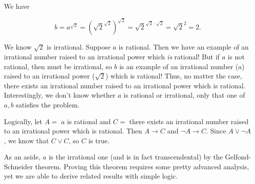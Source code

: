 \documentclass[../gatm_answers.tex]{subfiles}
\begin{document}
We have

$$b = a^{\sqrt{2}} = \left(\sqrt{2}^{\sqrt{2}}\right)^{\sqrt{2}} = \sqrt{2} ^ {\sqrt{2}\cdot \sqrt{2}} = \sqrt{2}^2 = 2.$$

We know $\sqrt{2}$ is irrational. Suppose $a$ is rational. Then we have an example of an irrational number raised to an irrational power which \textit{is} rational! But if $a$ is not rational, then must be irrational, so $b$ is an example of an irrational number ($a$) raised to an irrational power ($\sqrt{2}$) which is rational! Thus, no matter the case, there exists an irrational number raised to an irrational power which is rational. Interestingly, we don't know whether $a$ is rational or irrational, only that one of $a,b$ satisfies the problem.

Logically, let $A=$ $a$ is rational and $C=$ there exists an irrational number raised to an irrational power which is rational. Then $A\to C$ and $\lnot A\to C$. Since $A \lor \lnot A$, we know that $C\lor C$, so $C$ is true.

As an aside, $a$ is the irrational one (and is in fact transcendental) by the Gelfond-Schneider theorem. Proving this theorem requires some pretty advanced analysis, yet we are able to derive related results with simple logic.
\end{document}
